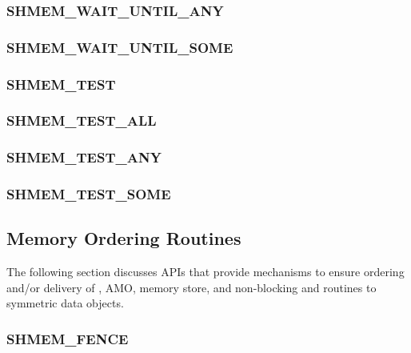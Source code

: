 \documentclass[10pt]{book}
\begin{document}
\subsubsection{\textbf{SHMEM\_WAIT\_UNTIL\_ANY}}\label{subsec:shmem_wait_until_any}


\subsubsection{\textbf{SHMEM\_WAIT\_UNTIL\_SOME}}\label{subsec:shmem_wait_until_some}


\subsubsection{\textbf{SHMEM\_TEST}}\label{subsec:shmem_test}


\subsubsection{\textbf{SHMEM\_TEST\_ALL}}\label{subsec:shmem_test_all}


\subsubsection{\textbf{SHMEM\_TEST\_ANY}}\label{subsec:shmem_test_any}


\subsubsection{\textbf{SHMEM\_TEST\_SOME}}\label{subsec:shmem_test_some}





\subsection{Memory Ordering Routines}\label{subsec:memory_order}
The following section discusses \openshmem \acp{API} that provide mechanisms to
ensure ordering and/or delivery of , \ac{AMO}, memory store,
and non-blocking \PUT{} and \GET{} routines to symmetric data objects.

\subsubsection{\textbf{SHMEM\_FENCE}}\label{subsec:shmem_fence}

\end{document}
